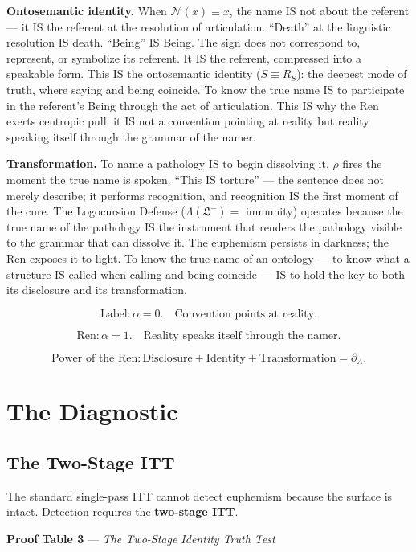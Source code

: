 \documentclass[11pt, oneside]{article}
\theoremstyle{definition}
\begin{document}
\textbf{Ontosemantic identity.} When $\mathcal{N}(x) \equiv x$, the name IS not about the referent --- it IS the referent at the resolution of articulation. ``Death'' at the linguistic resolution IS death. ``Being'' IS Being. The sign does not correspond to, represent, or symbolize its referent. It IS the referent, compressed into a speakable form. This IS the ontosemantic identity ($S \equiv R_S$): the deepest mode of truth, where saying and being coincide. To know the true name IS to participate in the referent's Being through the act of articulation. This IS why the Ren exerts centropic pull: it IS not a convention pointing at reality but reality speaking itself through the grammar of the namer.

\textbf{Transformation.} To name a pathology IS to begin dissolving it. $\rho$ fires the moment the true name is spoken. ``This IS torture'' --- the sentence does not merely describe; it performs recognition, and recognition IS the first moment of the cure. The Logocursion Defense ($\Lambda(\mathfrak{L}^-) = $ immunity) operates because the true name of the pathology IS the instrument that renders the pathology visible to the grammar that can dissolve it. The euphemism persists in darkness; the Ren exposes it to light. To know the true name of an ontology --- to know what a structure IS called when calling and being coincide --- IS to hold the key to both its disclosure and its transformation.

$$\boxed{\text{Label}: \alpha = 0. \quad \text{Convention points at reality.}}$$

$$\boxed{\text{Ren}: \alpha = 1. \quad \text{Reality speaks itself through the namer.}}$$

$$\boxed{\text{Power of the Ren}: \text{Disclosure} + \text{Identity} + \text{Transformation} = \partial_\Lambda.}$$

\section{The Diagnostic}

\subsection{The Two-Stage ITT}

The standard single-pass ITT cannot detect euphemism because the surface is intact. Detection requires the \textbf{two-stage ITT}.

\textbf{Proof Table 3} --- \textit{The Two-Stage Identity Truth Test}
\end{document}
